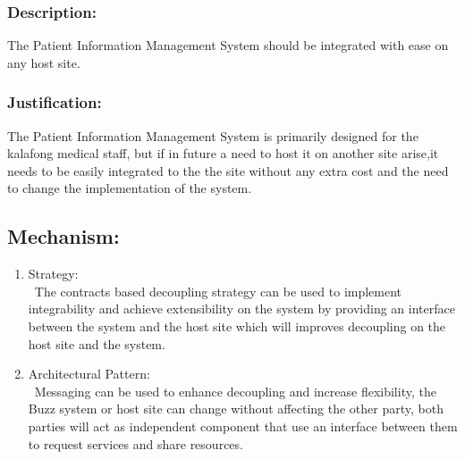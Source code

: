 
\subsubsection*{Description:}
	  The Patient Information Management System should be integrated with ease on any host site.
	 \subsubsection*{Justification:}
	   The Patient Information Management System is primarily designed for the kalafong medical staff, but if in future a need to host it on another site arise,it needs to be easily integrated to the the site without any extra cost and the need  to change the implementation of the system.
	\subsection*{Mechanism:}
	\begin{enumerate}
		\item Strategy: \\\ The contracts based decoupling strategy can be used to implement integrability and achieve extensibility on the system by providing an interface between the system and the host site which will improves decoupling on the host site and the system.    
		\item Architectural Pattern: \\\ Messaging can be used to enhance decoupling and increase flexibility, the Buzz system or host site can change without affecting the other party, both parties will act as independent component that use an interface between them to request services and share resources.  
	\end{enumerate}
